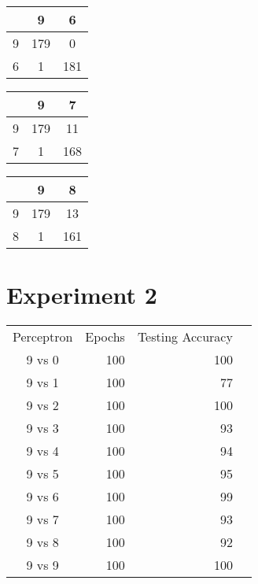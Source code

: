 \documentclass[12pt]{article}
\begin{document}
\begin{multicols}{3}
			\begin{tabular}{| c | c | c |}
				\hline
				& 9 & 6 \\ 
				\hline
				9 & 179 & 0 \\ 
				\hline
				6 & 1 & 181 \\ 
				\hline
			\end{tabular}
			\newline


			\begin{tabular}{| c | c | c |}
				\hline
				& 9 & 7 \\ 
				\hline
				9 & 179 & 11 \\ 
				\hline
				7 & 1 & 168 \\ 
				\hline
			\end{tabular}
			\newline


			\begin{tabular}{| c | c | c |}
				\hline
				& 9 & 8 \\ 
				\hline
				9 & 179 & 13 \\ 
				\hline
				8 & 1 & 161 \\ 
				\hline
			\end{tabular}
			\newline
		\end{multicols}
		\pagebreak
    \section*{Experiment 2}

		\begin{tabular}{ | c || r | r | r |}
			\hline
			 Perceptron & Epochs & Testing Accuracy \\ 
			 9 vs 0 & 100 & 100 \\ 
			\hline
			 9 vs 1 & 100 & 77 \\ 
			\hline
			 9 vs 2 & 100 & 100 \\ 
			\hline
			 9 vs 3 & 100 & 93 \\ 
			\hline
			 9 vs 4 & 100 & 94 \\ 
			\hline
			 9 vs 5 & 100 & 95 \\ 
			\hline
			 9 vs 6 & 100 & 99 \\ 
			\hline
			 9 vs 7 & 100 & 93 \\ 
			\hline
			 9 vs 8 & 100 & 92 \\ 
			\hline
			 9 vs 9 & 100 & 100 \\ 
			\hline
		\end{tabular}
\end{document}
